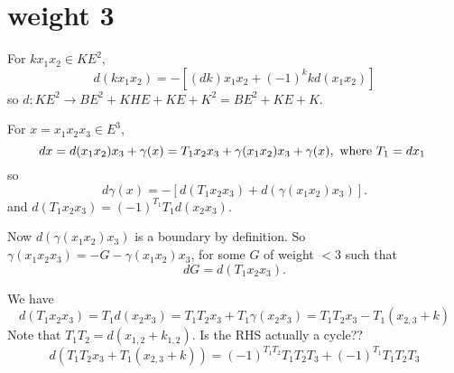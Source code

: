 \documentclass[11pt]{amsart}
\def\g{{\gamma}}
\begin{document}
\section{weight 3}
For $kx_1x_2\in KE^2$,
$$
d(kx_1x_2) = -[(dk)x_1x_2 + (-1)^k kd(x_1x_2)]
$$
so $d: KE^2 \to BE^2+KHE+KE+K^2 = BE^2+KE+K.$

For $x = x_1x_2x_3\in E^3$,
$$
dx = d(x_1x_2)x_3+\g(x) = T_1x_2x_3+\g(x_1x_2)x_3+\g(x), \hbox{ where $T_1 = dx_1$ }
$$
so
$$
d\g(x) = -[d(T_1x_2x_3)  + d(\g(x_1x_2)x_3)].
$$
and $d(T_1x_2x_3) = (-1)^{T_1}T_1d(x_2x_3)$.

Now $d(\g(x_1x_2)x_3)$ is a boundary by definition. So
 $\g(x_1x_2x_3) = -G-\g(x_1x_2)x_3$, for some $G$  of weight $<3$ such that
$$
dG = d(T_1x_2x_3).
$$

We have 
$$
d(T_1x_2x_3) = T_1d(x_2x_3) = T_1T_2x_3+T_1\g(x_{2}x_3) = T_1T_2x_3-T_1(x_{2,3}+k)
$$
Note that $T_1T_2 = d(x_{1,2}+k_{1,2})$.
Is the RHS actually a cycle??
$$
d(T_1T_2x_3+T_1(x_{2,3}+k)) = (-1)^{T_1T_2}T_1T_2T_3 + (-1)^{T_1}T_1T_2T_3 
$$
 
\end{document}
